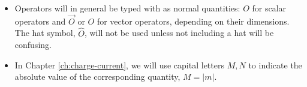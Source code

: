 \begin{itemize}
\item Operators will in general be typed with as normal quantities: $O$ for scalar operators and $\vec{O}$ or $O$ for vector operators, depending on their dimensions.
  The hat symbol, $\hat{O}$, will not be used unless not including a hat will be confusing.

\item In Chapter \ref{ch:charge-current}, we will use capital letters \( M, N \) to indicate the absolute value of the corresponding quantity, \( M = |m| \).
\end{itemize}
